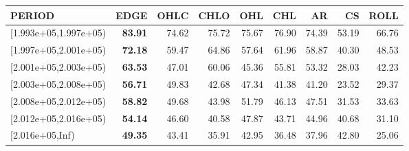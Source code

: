 \begin{table}[ht]
\centering
\begin{tabular}{lrrrrrrrr}
  \hline
PERIOD & EDGE & OHLC & CHLO & OHL & CHL & AR & CS & ROLL \\ 
  \hline
[1.993e+05,1.997e+05) & \textbf{83.91} & 74.62 & 75.72 & 75.67 & 76.90 & 74.39 & 53.19 & 66.76 \\ 
  [1.997e+05,2.001e+05) & \textbf{72.18} & 59.47 & 64.86 & 57.64 & 61.96 & 58.87 & 40.30 & 48.53 \\ 
  [2.001e+05,2.003e+05) & \textbf{63.53} & 47.01 & 60.06 & 45.36 & 55.81 & 53.32 & 28.03 & 42.23 \\ 
  [2.003e+05,2.008e+05) & \textbf{56.71} & 49.83 & 42.68 & 47.34 & 41.38 & 41.20 & 23.52 & 29.37 \\ 
  [2.008e+05,2.012e+05) & \textbf{58.82} & 49.68 & 43.98 & 51.79 & 46.13 & 47.51 & 31.53 & 33.63 \\ 
  [2.012e+05,2.016e+05) & \textbf{54.14} & 46.60 & 40.58 & 47.87 & 43.71 & 44.96 & 40.68 & 31.10 \\ 
  [2.016e+05,Inf) & \textbf{49.35} & 43.41 & 35.91 & 42.95 & 36.48 & 37.96 & 42.80 & 25.06 \\ 
   \hline
\end{tabular}
\end{table}
